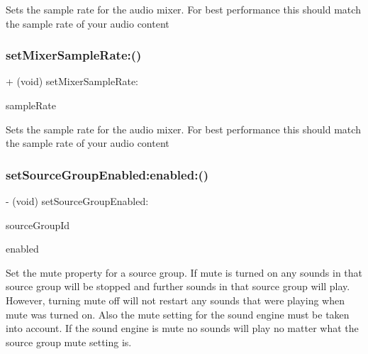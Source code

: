 Sets the sample rate for the audio mixer. For best performance this should match the sample rate of your audio content \mbox{\label{interfaceCDSoundEngine_ab917455684b0ff4ea92e3d2a82d3530c}} 
\subsubsection{\texorpdfstring{set\+Mixer\+Sample\+Rate\+:()}{setMixerSampleRate:()}\hspace{0.1cm}{\footnotesize\ttfamily [4/4]}}
{\footnotesize\ttfamily + (void) set\+Mixer\+Sample\+Rate\+: \begin{DoxyParamCaption}\item[{(Float32)}]{sample\+Rate }\end{DoxyParamCaption}}

Sets the sample rate for the audio mixer. For best performance this should match the sample rate of your audio content \mbox{\label{interfaceCDSoundEngine_ae791fe92a23a27d282fff5108ed8b8c0}} 
\subsubsection{\texorpdfstring{set\+Source\+Group\+Enabled\+:enabled\+:()}{setSourceGroupEnabled:enabled:()}}
{\footnotesize\ttfamily -\/ (void) set\+Source\+Group\+Enabled\+: \begin{DoxyParamCaption}\item[{(int)}]{source\+Group\+Id }\item[{enabled:(B\+O\+OL)}]{enabled }\end{DoxyParamCaption}}

Set the mute property for a source group. If mute is turned on any sounds in that source group will be stopped and further sounds in that source group will play. However, turning mute off will not restart any sounds that were playing when mute was turned on. Also the mute setting for the sound engine must be taken into account. If the sound engine is mute no sounds will play no matter what the source group mute setting is. \mbox{\label{interfaceCDSoundEngine_afd29660acffd4fd1f7a667e4a389f84a}} 
